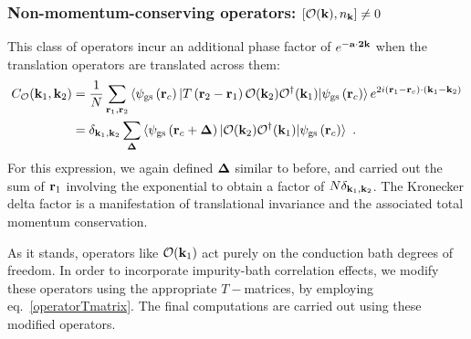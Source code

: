 \documentclass[reprint,hidelinks,onecolumn]{revtex4-2}
\begin{document}
\subsubsection{Non-momentum-conserving operators: \(\left[\mathcal{O}({\bf k}), n_{{\bf k}}\right] \neq 0\)}
This class of operators incur an additional phase factor of \(e^{-{\bf a}\cdot{\bf 2k}}\) when the translation operators are translated across them:
\begin{equation}\begin{aligned}
	C_{\mathcal{O}}({\bf k}_1,{\bf k}_2) &= \frac{1}{N}\sum_{{\bf r}_1,{\bf r}_2}\braket{\psi_\text{gs}\left({\bf r}_c\right) | T\left({\bf r}_2 - {\bf r}_1\right) \mathcal{O}({\bf k}_2)\mathcal{O}^\dagger({\bf k}_1) | \psi_\text{gs}\left({\bf r}_c\right)}e^{2i\left( {\bf r}_1 - {\bf r}_c \right) \cdot \left( {\bf k}_1 - {\bf k}_2 \right)} \\
										 &= \delta_{{\bf k}_1, {\bf k}_2}\sum_{{\bf \Delta}}\braket{\psi_\text{gs}\left({\bf r}_c + {\bf \Delta}\right) | \mathcal{O}({\bf k}_2)\mathcal{O}^\dagger({\bf k}_1) | \psi_\text{gs}\left({\bf r}_c\right)}~.
\end{aligned}\end{equation}
For this expression, we again defined \({\bf \Delta}\) similar to before, and carried out the sum of \({\bf r}_1\) involving the exponential to obtain a factor of \(N \delta_{{\bf k}_1, {\bf k}_2}\). The Kronecker delta factor is a manifestation of translational invariance and the associated total momentum conservation.

As it stands, operators like \(\mathcal{O}({\bf k}_1)\) act purely on the conduction bath degrees of freedom. In order to incorporate impurity-bath correlation effects, we modify these operators using the appropriate \(T-\)matrices, by employing eq.~\ref{operatorTmatrix}. The final computations are carried out using these modified operators.
\end{document}
